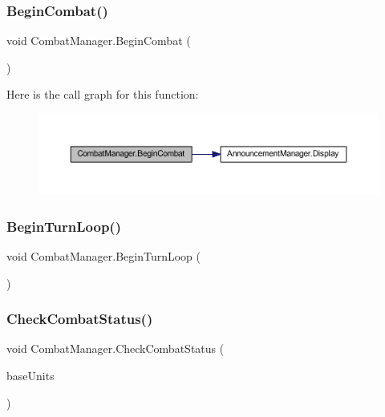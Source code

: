 \subsubsection{\texorpdfstring{BeginCombat()}{BeginCombat()}}
{\footnotesize\ttfamily void Combat\+Manager.\+Begin\+Combat (\begin{DoxyParamCaption}{ }\end{DoxyParamCaption})}

Here is the call graph for this function\+:
\nopagebreak
\begin{figure}[H]
\begin{center}
\leavevmode
\includegraphics[width=350pt]{class_combat_manager_ab5d0c356fd55e86d62b03c015754abee_cgraph}
\end{center}
\end{figure}
\mbox{\label{class_combat_manager_aa31394843beacdbfd52d683a68a7f454}} 
\subsubsection{\texorpdfstring{BeginTurnLoop()}{BeginTurnLoop()}}
{\footnotesize\ttfamily void Combat\+Manager.\+Begin\+Turn\+Loop (\begin{DoxyParamCaption}{ }\end{DoxyParamCaption})}

\mbox{\label{class_combat_manager_aea6dfda807c4ec793ed26c5d220b84fb}} 
\subsubsection{\texorpdfstring{CheckCombatStatus()}{CheckCombatStatus()}}
{\footnotesize\ttfamily void Combat\+Manager.\+Check\+Combat\+Status (\begin{DoxyParamCaption}\item[{List$<$ \mbox{\hyperlink{class_base_unit}{Base\+Unit}} $>$}]{base\+Units }\end{DoxyParamCaption})}


